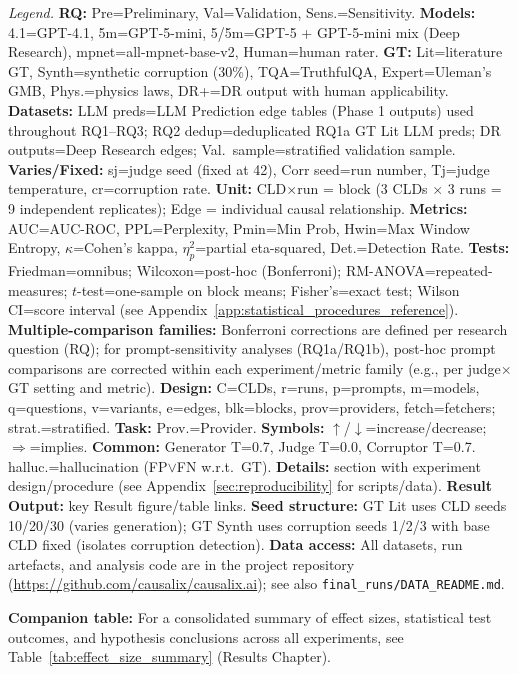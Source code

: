 \begin{landscape}
\begin{table}[H]
\vspace{0.3em}
\begin{minipage}{\linewidth}
\scriptsize
\textit{Legend.} 
\textbf{RQ:} Pre=Preliminary, Val=Validation, Sens.=Sensitivity.
\textbf{Models:} 4.1=GPT-4.1, 5m=GPT-5-mini, 5/5m=GPT-5 + GPT-5-mini mix (Deep Research), mpnet=all-mpnet-base-v2, Human=human rater.
\textbf{GT:} Lit=literature GT, Synth=synthetic corruption (30\%), TQA=TruthfulQA, Expert=Uleman's GMB, Phys.=physics laws, DR+=DR output with human applicability.
\textbf{Datasets:} LLM preds=LLM Prediction edge tables (Phase 1 outputs) used throughout RQ1--RQ3; RQ2 dedup=deduplicated RQ1a GT Lit LLM preds; DR outputs=Deep Research edges; Val.\ sample=stratified validation sample.
\textbf{Varies/Fixed:} sj=judge seed (fixed at 42), Corr seed=run number, Tj=judge temperature, cr=corruption rate.
\textbf{Unit:} CLD$\times$run = block (3 CLDs $\times$ 3 runs = 9 independent replicates); Edge = individual causal relationship.
\textbf{Metrics:} AUC=AUC-ROC, PPL=Perplexity, Pmin=Min Prob, Hwin=Max Window Entropy, $\kappa$=Cohen's kappa, $\eta^2_p$=partial eta-squared, Det.=Detection Rate.
\textbf{Tests:} Friedman=omnibus; Wilcoxon=post-hoc (Bonferroni); RM-ANOVA=repeated-measures; $t$-test=one-sample on block means; Fisher's=exact test; Wilson CI=score interval (see Appendix~\ref{app:statistical_procedures_reference}).
\textbf{Multiple-comparison families:} Bonferroni corrections are defined per research question (RQ); for prompt-sensitivity analyses (RQ1a/RQ1b), post-hoc prompt comparisons are corrected within each experiment/metric family (e.g., per judge$\times$GT setting and metric).
\textbf{Design:} C=CLDs, r=runs, p=prompts, m=models, q=questions, v=variants, e=edges, blk=blocks, prov=providers, fetch=fetchers; strat.=stratified. \textbf{Task:} Prov.=Provider. \textbf{Symbols:} $\uparrow$/$\downarrow$=increase/decrease; $\Rightarrow$=implies.
\textbf{Common:} Generator T=0.7, Judge T=0.0, Corruptor T=0.7. halluc.=hallucination (FP$\lor$FN w.r.t.\ GT).
\textbf{Details:} section with experiment design/procedure (see Appendix~\ref{sec:reproducibility} for scripts/data). \textbf{Result Output:} key Result figure/table links.
\textbf{Seed structure:} GT Lit uses CLD seeds 10/20/30 (varies generation); GT Synth uses corruption seeds 1/2/3 with base CLD fixed (isolates corruption detection).
\textbf{Data access:} All datasets, run artefacts, and analysis code are in the project repository (\url{https://github.com/causalix/causalix.ai}); see also \texttt{final\_runs/DATA\_README.md}.

\medskip
\textbf{Companion table:} For a consolidated summary of effect sizes, statistical test outcomes, and hypothesis conclusions across all experiments, see Table~\ref{tab:effect_size_summary} (Results Chapter).
\end{minipage}
\end{table}
\end{landscape}

